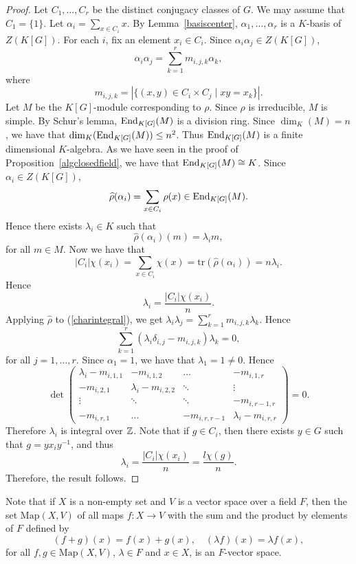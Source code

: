 \begin{proof}
    Let $C_1,\dots ,C_r$ be the distinct conjugacy classes of $G$. We may assume that $C_1=\{ 1\}$. 
    Let $\alpha_i=\sum_{x\in C_i}x$. By Lemma~\ref{basiscenter}, $\alpha_1,\dots ,\alpha_r$ is a $K$-basis of $Z(K[G])$.
    For each $i$, fix an element $x_i\in C_i$. Since $\alpha_i\alpha_j\in Z(K[G])$, 
    \begin{equation}\label{charintegral} \alpha_i\alpha_j=\sum_{k=1}^rm_{i,j,k}\alpha_k,\end{equation}
    where 
    \[ m_{i,j,k}=|\{ (x,y)\in C_i\times C_j\mid xy=x_k\}|.\]
    Let $M$ be the $K[G]$-module corresponding to $\rho$. Since $\rho$ is irreducible, $M$ is simple. By Schur's lemma,
    $\operatorname{End}_{K[G]}(M)$ is a division ring. Since $\dim_K(M)=n$, we have that $\dim_K(\operatorname{End}_{K[G]}(M))\leq n^2$.
    Thus $\operatorname{End}_{K[G]}(M)$ is a finite dimensional $K$-algebra. As we have seen in the proof of Proposition~\ref{algclosedfield},
    we have that $\operatorname{End}_{K[G]}(M)\cong K$. Since $\alpha_i\in Z(K[G])$,
    \[ \widehat{\rho}(\alpha_i)=\sum_{x\in C_i}\rho(x)\in\operatorname{End}_{K[G]}(M).\]
    Hence there exists $\lambda_i\in K$ such that
    \[\widehat{\rho}(\alpha_i)(m)=\lambda_im,\]
    for all $m\in M$. Now we have that
    \[ |C_i|\chi(x_i)=\sum_{x\in C_i}\chi(x)=\mathrm{tr} (\widehat{\rho}(\alpha_i))=n\lambda_i.\]
    Hence 
    \[\lambda_i=\frac{|C_i|\chi(x_i)}{n}.\]
    Applying $\widehat{\rho}$ to (\ref{charintegral}), we get
    $\lambda_i\lambda_j=\sum_{k=1}^rm_{i,j,k}\lambda_k$. Hence
    \[ \sum_{k=1}^r(\lambda_i\delta_{i,j}-m_{i,j,k})\lambda_k=0,\]
    for all $j=1,\dots, r$. Since $\alpha_1=1$, we have that $\lambda_1=1\neq 0$. Hence
    \[\det\left(\begin{array}{cccc}
    \lambda_i-m_{i,1,1}&-m_{i,1,2}&\ldots &-m_{i,1,r}\\
    -m_{i,2,1}&\lambda_i-m_{i,2,2}&\ddots&\vdots\\
    \vdots&\ddots&\ddots&-m_{i,r-1,r}\\
    -m_{i,r,1}&\ldots&-m_{i,r,r-1}&\lambda_i-m_{i,r,r}
    \end{array}\right)=0.\]
    Therefore $\lambda_i$ is integral over $\mathbb{Z}$. Note that if $g\in C_i$, then there exists $y\in G$ such that $g=yx_iy^{-1}$, and thus
    \[\lambda_i=\frac{|C_i|\chi(x_i)}{n}=\frac{l\chi(g)}{n}.\]
    Therefore, the result follows.
\end{proof}

Note that if $X$ is a non-empty set and $V$ is a vector space over a field $F$, then the set 
$\mathrm{Map}(X,V)$ of all maps $f\colon X\rightarrow V$ with the sum and the product by elements of $F$ defined by
\[(f+g)(x)=f(x)+g(x),\quad (\lambda f)(x)=\lambda f(x),\]
for all $f,g\in\mathrm{Map}(X,V)$, $\lambda\in F$ and $x\in X$, is an $F$-vector space.

